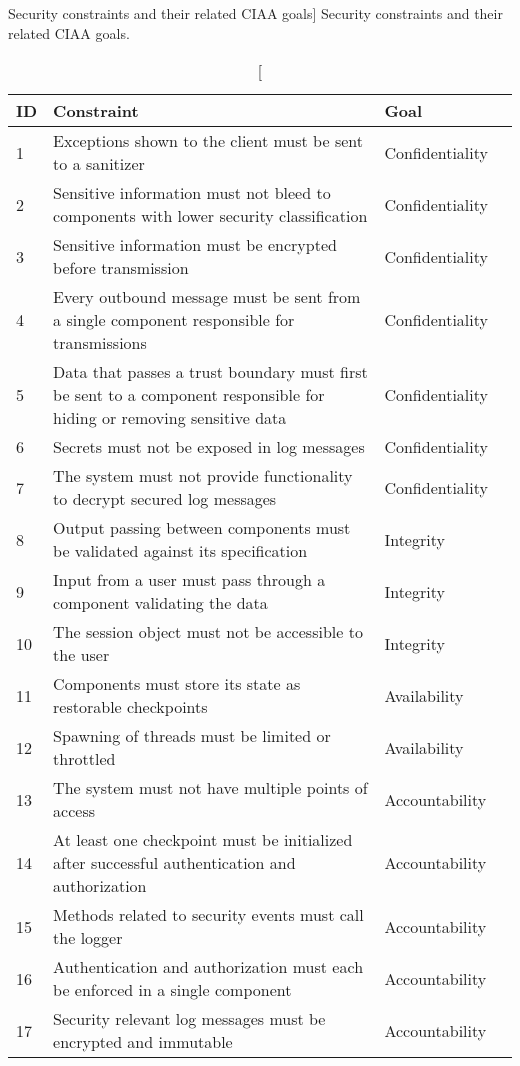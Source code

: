 \begin{table}
\captionsetup{justification=centering}
\caption
    [Security constraints and their related CIAA goals]
    {Security constraints and their related CIAA goals.}
\begin{center}
\begin{tabular}{lp{10.4cm}ll}
\hline
\textbf{ID} & \textbf{Constraint} & \textbf{Goal} \\
\hline
1  & Exceptions shown to the client must be sent to a sanitizer  & Confidentiality \\
\rowcolor{RowColor}
2  & Sensitive information must not bleed to components with lower security classification  & Confidentiality \\
3  & Sensitive information must be encrypted before transmission  & Confidentiality \\
\rowcolor{RowColor}
4  & Every outbound message must be sent from a single component responsible for transmissions  & Confidentiality \\
5  & Data that passes a trust boundary must first be sent to a component responsible for hiding or removing sensitive data  & Confidentiality \\
\rowcolor{RowColor}
6  & Secrets must not be exposed in log messages  & Confidentiality \\
7  & The system must not provide functionality to decrypt secured log messages  & Confidentiality \\
\rowcolor{RowColor}
8  & Output passing between components must be validated against its specification & Integrity \\
9  & Input from a user must pass through a component validating the data  & Integrity \\
\rowcolor{RowColor}
10 & The session object must not be accessible to the user  & Integrity \\
11 & Components must store its state as restorable checkpoints  & Availability \\
\rowcolor{RowColor}
12 & Spawning of threads must be limited or throttled  & Availability \\
13 & The system must not have multiple points of access  & Accountability \\
\rowcolor{RowColor}
14 & At least one checkpoint must be initialized after successful authentication and authorization  & Accountability \\
15 & Methods related to security events must call the logger  & Accountability \\
\rowcolor{RowColor}
16 & Authentication and authorization must each be enforced in a single component  & Accountability \\
17 & Security relevant log messages must be encrypted and immutable & Accountability \\
\hline
\end{tabular}
\end{center}
\label{tab:all_measures}
\end{table}

